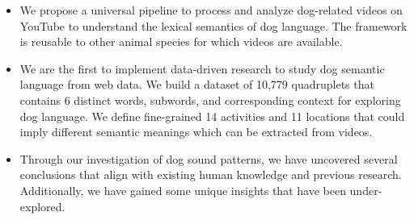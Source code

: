 \begin{itemize}
	\item We propose a universal pipeline to process and analyze dog-related videos on YouTube to understand the lexical semantics of dog language. The framework is reusable to other animal species for which videos are available.
\item We are the first to implement data-driven research to study dog semantic language from web data. We build a dataset of 10,779 quadruplets that contains 6 distinct words, subwords, and corresponding context for exploring dog language. We define fine-grained 14 activities and 11 locations that could imply different semantic meanings which can be extracted from videos. 
\item Through our investigation of dog sound patterns, we have uncovered several conclusions that align with existing human knowledge and previous research. Additionally, we have gained some unique insights that have been under-explored. 
\end{itemize}

